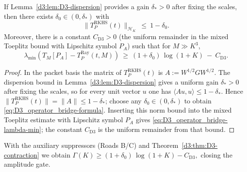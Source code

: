 \begin{theorem}\label{d3:thm:D3-contraction}
If Lemma~\ref{d3:lem:D3-dispersion} provides a gain $\delta_\ast>0$ after fixing the scales, then there exists $\delta_0\in(0,\delta_\ast)$ with
\begin{equation}\label{eq:D3_operator_bridge-formula}
  \|T_P^{\mathrm{RKHS}}(t)\|_{\mathcal H_K}\ \le\ 1-\delta_0.
\end{equation}
Moreover, there is a constant $C_{\mathrm{D3}}>0$ (the uniform remainder in the mixed Toeplitz bound with Lipschitz symbol $P_A$) such that for $M\gg K^3$,
\begin{equation}\label{eq:D3_operator_bridge-lambda-min}
  \lambda_{\min}(T_M[P_A]-T_P^{\mathrm{Ray}}(t,M))\ \ge\ (1+\delta_0)\,\log(1{+}K)\ -\ C_{\mathrm{D3}}.
\end{equation}
\end{theorem}

\begin{proof}
In the packet basis the matrix of $T_P^{\mathrm{RKHS}}(t)$ is $A:=W^{1/2}GW^{1/2}$. The dispersion bound in
Lemma~\ref{d3:lem:D3-dispersion} gives a uniform gain $\delta_\ast>0$ after fixing the scales, so for every unit vector $u$
one has $\langle Au,u\rangle\le 1-\delta_\ast$. Hence $\|T_P^{\mathrm{RKHS}}(t)\|=\|A\|\le 1-\delta_\ast$; choose any
$\delta_0\in(0,\delta_\ast)$ to obtain \eqref{eq:D3_operator_bridge-formula}. Inserting this norm bound into the mixed Toeplitz
estimate with Lipschitz symbol $P_A$ gives \eqref{eq:D3_operator_bridge-lambda-min}; the constant
$C_{\mathrm{D3}}$ is the uniform remainder from that bound.
\end{proof}

\begin{corollary}\label{d3:cor:amplitude-closure}
With the auxiliary suppressors (Roads B/C) and Theorem~\ref{d3:thm:D3-contraction} we obtain
\(
  \Gamma(K) \ge (1+\delta_0)\,\log(1+K) - C_{\mathrm{D3}},
\)
closing the amplitude gate.
\end{corollary}
